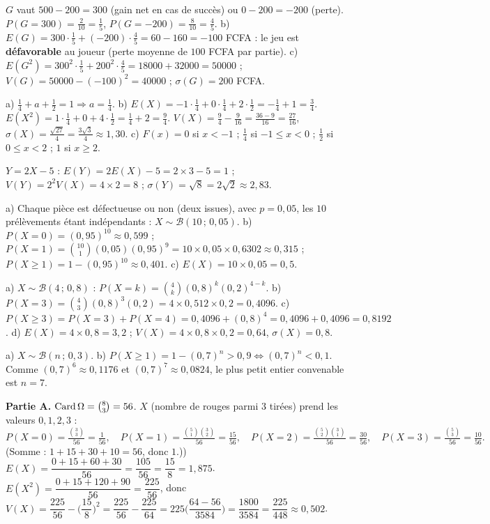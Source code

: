 $G$ vaut $500-200=300$ (gain net en cas de succès) ou $0-200=-200$ (perte).
$P(G{=}300)=\frac{2}{10}=\frac15$, $P(G{=}-200)=\frac{8}{10}=\frac45$.\;
b) $E(G)=300\cdot\frac15+(-200)\cdot\frac45=60-160=-100$ FCFA : le jeu est
\textbf{défavorable} au joueur (perte moyenne de $100$ FCFA par partie).\;
c) $E(G^2)=300^2\cdot\frac15+200^2\cdot\frac45=18000+32000=50000$ ;
$V(G)=50000-(-100)^2=40000$ ; $\sigma(G)=200$ FCFA.

a) $\frac14+a+\frac12=1\Rightarrow a=\frac14$.\;
b) $E(X)=-1\cdot\frac14+0\cdot\frac14+2\cdot\frac12=-\frac14+1=\frac34$.
$E(X^2)=1\cdot\frac14+0+4\cdot\frac12=\frac14+2=\frac94$.
$V(X)=\frac94-\frac9{16}=\frac{36-9}{16}=\frac{27}{16}$,
$\sigma(X)=\frac{\sqrt{27}}{4}=\frac{3\sqrt3}{4}\approx1{,}30$.\;
c) $F(x)=0$ si $x<-1$ ; $\frac14$ si $-1\le x<0$ ; $\frac12$ si $0\le x<2$ ; $1$ si $x\ge2$.

$Y=2X-5$ : $E(Y)=2E(X)-5=2\times3-5=1$ ; $V(Y)=2^2V(X)=4\times2=8$ ;
$\sigma(Y)=\sqrt8=2\sqrt2\approx2{,}83$.

a) Chaque pièce est défectueuse ou non (deux issues), avec $p=0{,}05$, les $10$
prélèvements étant indépendants : $X\sim\mathcal B(10\,;\,0{,}05)$.\;
b) $P(X{=}0)=(0{,}95)^{10}\approx0{,}599$ ;
$P(X{=}1)=\binom{10}{1}(0{,}05)(0{,}95)^9=10\times0{,}05\times0{,}6302\approx0{,}315$ ;
$P(X\ge1)=1-(0{,}95)^{10}\approx0{,}401$.\;
c) $E(X)=10\times0{,}05=0{,}5$.

a) $X\sim\mathcal B(4\,;\,0{,}8)$ : $P(X{=}k)=\binom4k(0{,}8)^k(0{,}2)^{4-k}$.\;
b) $P(X{=}3)=\binom43(0{,}8)^3(0{,}2)=4\times0{,}512\times0{,}2=0{,}4096$.\;
c) $P(X\ge3)=P(X{=}3)+P(X{=}4)=0{,}4096+(0{,}8)^4=0{,}4096+0{,}4096=0{,}8192$.\;
d) $E(X)=4\times0{,}8=3{,}2$ ; $V(X)=4\times0{,}8\times0{,}2=0{,}64$, $\sigma(X)=0{,}8$.

a) $X\sim\mathcal B(n\,;\,0{,}3)$.\;
b) $P(X\ge1)=1-(0{,}7)^n>0{,}9 \iff (0{,}7)^n<0{,}1$. Comme $(0{,}7)^6\approx0{,}1176$
et $(0{,}7)^7\approx0{,}0824$, le plus petit entier convenable est $n=7$.

\textbf{Partie A.} $\operatorname{Card}\Omega=\binom83=56$. $X$ (nombre de rouges parmi $3$
tirées) prend les valeurs $0,1,2,3$ :
\[
P(X{=}0)=\tfrac{\binom33}{56}=\tfrac1{56},\quad
P(X{=}1)=\tfrac{\binom51\binom32}{56}=\tfrac{15}{56},\quad
P(X{=}2)=\tfrac{\binom52\binom31}{56}=\tfrac{30}{56},\quad
P(X{=}3)=\tfrac{\binom53}{56}=\tfrac{10}{56}.
\]
(Somme : $1+15+30+10=56$, donc $1$.)) $E(X)=\dfrac{0+15+60+30}{56}=\dfrac{105}{56}=\dfrac{15}{8}=1{,}875$.
$E(X^2)=\dfrac{0+15+120+90}{56}=\dfrac{225}{56}$, donc
$V(X)=\dfrac{225}{56}-\Big(\dfrac{15}{8}\Big)^2=\dfrac{225}{56}-\dfrac{225}{64}
=225\Big(\dfrac{64-56}{3584}\Big)=\dfrac{1800}{3584}=\dfrac{225}{448}\approx0{,}502$.


